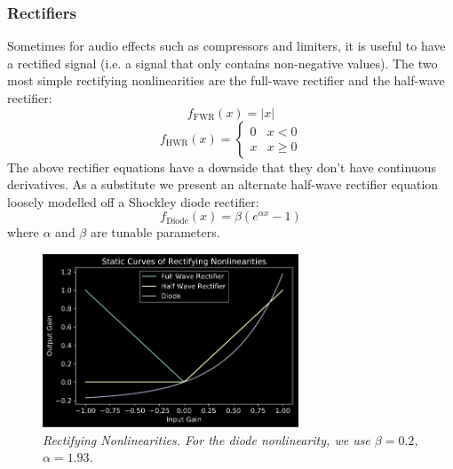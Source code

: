 \documentclass[twoside,a4paper]{article}
\begin{document}
\subsubsection{Rectifiers} \label{sec:rect}
%
Sometimes for audio effects such as compressors and limiters, it is
useful to have a rectified signal (i.e. a signal that only contains
non-negative values). The two most simple rectifying nonlinearities
are the full-wave rectifier and the half-wave rectifier:
%
\begin{equation}
    f_{\text{FWR}}(x) = |x|
    \label{eq:fwr}
\end{equation}
%
\begin{equation}
    f_{\text{HWR}}(x) = \begin{cases}
        0& x < 0 \\
        x& x \geq 0
    \end{cases}
    \label{eq:hwr}
\end{equation}
%
The above rectifier equations have a downside that they don't have
continuous derivatives. As a substitute we present an alternate
half-wave rectifier equation loosely modelled off a Shockley diode
rectifier:
\begin{equation}
    f_{\text{Diode}}(x) = \beta \left(e^{\alpha x} - 1 \right)
    \label{eq:diode}
\end{equation}
%
where $\alpha$ and $\beta$ are tunable parameters.
%
\begin{figure}[h]
    \center
    \includegraphics[width=3in]{../Exciter/Pics/rect_static.png}
    \caption{\label{Rects}{\it Rectifying Nonlinearities. For the diode nonlinearity,
    we use $\beta = 0.2$, $\alpha = 1.93$.}}
\end{figure}
%
\end{document}
